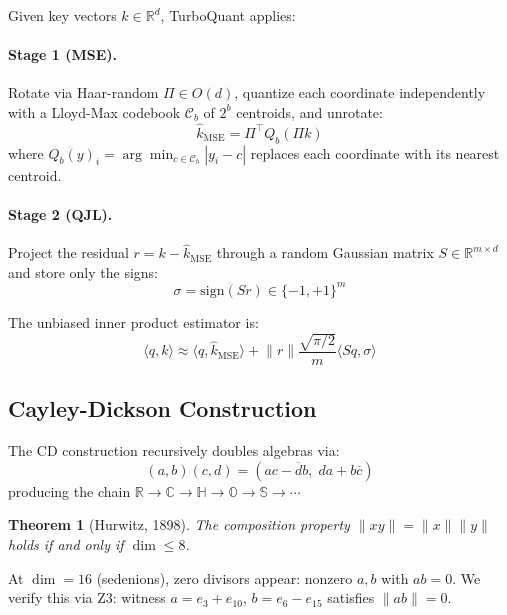 \documentclass[sigconf,anonymous,review]{acmart}
\newtheorem{theorem}{Theorem}
\newcommand{\R}{\mathbb{R}}
\newcommand{\C}{\mathbb{C}}
\newcommand{\HH}{\mathbb{H}}
\newcommand{\OO}{\mathbb{O}}
\newcommand{\norm}[1]{\lVert #1 \rVert}
\newcommand{\inner}[2]{\langle #1, #2 \rangle}
\newcommand{\conj}[1]{\overline{#1}}
\begin{document}
Given key vectors $k \in \R^d$, TurboQuant applies:

\paragraph{Stage 1 (MSE).}
Rotate via Haar-random $\Pi \in O(d)$, quantize each coordinate
independently with a Lloyd-Max codebook $\mathcal{C}_b$ of $2^b$ centroids,
and unrotate:
\begin{equation}
  \hat{k}_{\mathrm{MSE}} = \Pi^\top Q_b(\Pi k)
  \label{eq:mse-stage}
\end{equation}
where $Q_b(y)_i = \arg\min_{c \in \mathcal{C}_b} |y_i - c|$ replaces
each coordinate with its nearest centroid.

\paragraph{Stage 2 (QJL).}
Project the residual $r = k - \hat{k}_{\mathrm{MSE}}$ through a random
Gaussian matrix $S \in \R^{m \times d}$ and store only the signs:
\begin{equation}
  \sigma = \mathrm{sign}(Sr) \in \{-1, +1\}^m
  \label{eq:qjl-signs}
\end{equation}

The unbiased inner product estimator is:
\begin{equation}
  \inner{q}{k} \approx \inner{q}{\hat{k}_{\mathrm{MSE}}}
   + \norm{r} \frac{\sqrt{\pi/2}}{m} \inner{Sq}{\sigma}
  \label{eq:qjl-estimator}
\end{equation}

\subsection{Cayley-Dickson Construction}

The CD construction recursively doubles algebras via:
\begin{equation}
  (a,b)(c,d) = (ac - \conj{d}b,\; da + b\conj{c})
  \label{eq:cd-doubling}
\end{equation}
producing the chain $\R \to \C \to \HH \to \OO \to \mathbb{S} \to \cdots$

\begin{theorem}[Hurwitz, 1898]
\label{thm:hurwitz}
The composition property $\norm{xy} = \norm{x}\norm{y}$ holds if and
only if $\dim \leq 8$.
\end{theorem}

At $\dim = 16$ (sedenions), zero divisors appear: nonzero $a, b$
with $ab = 0$. We verify this via Z3: witness $a = e_3 + e_{10}$,
$b = e_6 - e_{15}$ satisfies $\norm{ab} = 0$.
\end{document}
